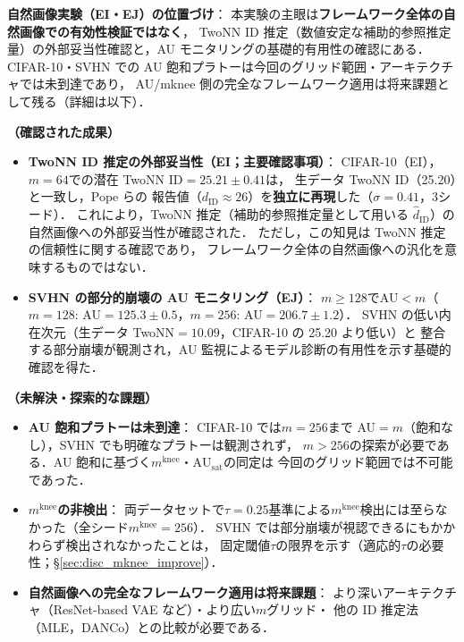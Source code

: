 \documentclass[11pt,a4paper]{jsarticle}
\newcommand{\AUsat}{\mathrm{AU}_{\mathrm{sat}}}
\newcommand{\mknee}{m^{\mathrm{knee}}}
\begin{document}
\textbf{自然画像実験（EI・EJ）の位置づけ}：
本実験の主眼は\textbf{フレームワーク全体の自然画像での有効性検証ではなく}，
TwoNN ID 推定（数値安定な補助的参照推定量）の外部妥当性確認と，AU モニタリングの基礎的有用性の確認にある．
CIFAR-10・SVHN での AU 飽和プラトーは今回のグリッド範囲・アーキテクチャでは未到達であり，
AU/mknee 側の完全なフレームワーク適用は将来課題として残る（詳細は以下）．

\textbf{（確認された成果）}
\begin{itemize}
  \item \textbf{TwoNN ID 推定の外部妥当性（EI；主要確認事項）}：
        CIFAR-10（EI），$m=64$での潜在 TwoNN ID$=25.21\pm0.41$は，
        生データ TwoNN ID（25.20）と一致し，Pope ら\cite{pope2021intrinsic}の
        報告値（$d_\mathrm{ID} \approx 26$）を\textbf{独立に再現}した（$\sigma=0.41$，3シード）．
        これにより，TwoNN 推定（補助的参照推定量として用いる $\hat{d}_\mathrm{ID}$）の
        自然画像への外部妥当性が確認された．
        ただし，この知見は TwoNN 推定の信頼性に関する確認であり，
        フレームワーク全体の自然画像への汎化を意味するものではない．
  \item \textbf{SVHN の部分的崩壊の AU モニタリング（EJ）}：
        $m \geq 128$でAU$< m$（$m=128$: AU$=125.3\pm0.5$，$m=256$: AU$=206.7\pm1.2$）．
        SVHN の低い内在次元（生データ TwoNN$=10.09$，CIFAR-10 の 25.20 より低い）と
        整合する部分崩壊が観測され，AU 監視によるモデル診断の有用性を示す基礎的確認を得た．
\end{itemize}

\textbf{（未解決・探索的な課題）}
\begin{itemize}
  \item \textbf{AU 飽和プラトーは未到達}：
        CIFAR-10 では$m=256$まで AU$=m$（飽和なし），SVHN でも明確なプラトーは観測されず，
        $m > 256$の探索が必要である．AU 飽和に基づく$\mknee$・$\AUsat$の同定は
        今回のグリッド範囲では不可能であった．
  \item \textbf{$\mknee$の非検出}：
        両データセットで$\tau = 0.25$基準による$\mknee$検出には至らなかった（全シード$\mknee=256$）．
        SVHN では部分崩壊が視認できるにもかかわらず検出されなかったことは，
        固定閾値$\tau$の限界を示す（適応的$\tau$の必要性；§\ref{sec:disc_mknee_improve}）．
  \item \textbf{自然画像への完全なフレームワーク適用は将来課題}：
        より深いアーキテクチャ（ResNet-based VAE など）・より広い$m$グリッド・
        他の ID 推定法（MLE，DANCo）との比較が必要である．
\end{itemize}
\end{document}
